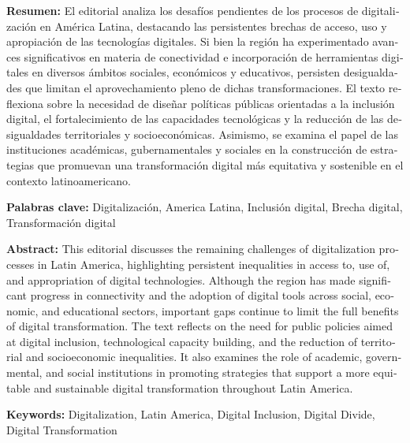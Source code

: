 \begin{tcolorbox}[colback=brown!8!white,colframe=brown!8!white,boxrule=0pt,arc=2pt,left=4pt,right=4pt,top=3pt,bottom=3pt,before skip=4pt,after skip=4pt]
\begin{otherlanguage}{spanish}
\sffamily\small \textbf{Resumen:} El editorial analiza los desafíos pendientes de los procesos de digitalización en América Latina, destacando las persistentes brechas de acceso, uso y apropiación de las tecnologías digitales. Si bien la región ha experimentado avances significativos en materia de conectividad e incorporación de herramientas digitales en diversos ámbitos sociales, económicos y educativos, persisten desigualdades que limitan el aprovechamiento pleno de dichas transformaciones. El texto reflexiona sobre la necesidad de diseñar políticas públicas orientadas a la inclusión digital, el fortalecimiento de las capacidades tecnológicas y la reducción de las desigualdades territoriales y socioeconómicas. Asimismo, se examina el papel de las instituciones académicas, gubernamentales y sociales en la construcción de estrategias que promuevan una transformación digital más equitativa y sostenible en el contexto latinoamericano.
\par\smallskip\noindent\textbf{Palabras clave:} Digitalización, America Latina, Inclusión digital, Brecha digital, Transformación digital
\end{otherlanguage}
\end{tcolorbox}

\begin{tcolorbox}[colback=brown!8!white,colframe=brown!8!white,boxrule=0pt,arc=2pt,left=4pt,right=4pt,top=3pt,bottom=3pt,before skip=4pt,after skip=4pt]
\begin{otherlanguage}{english}
\sffamily\small \textbf{Abstract:} This editorial discusses the remaining challenges of digitalization processes in Latin America, highlighting persistent inequalities in access to, use of, and appropriation of digital technologies. Although the region has made significant progress in connectivity and the adoption of digital tools across social, economic, and educational sectors, important gaps continue to limit the full benefits of digital transformation. The text reflects on the need for public policies aimed at digital inclusion, technological capacity building, and the reduction of territorial and socioeconomic inequalities. It also examines the role of academic, governmental, and social institutions in promoting strategies that support a more equitable and sustainable digital transformation throughout Latin America.
\par\smallskip\noindent\textbf{Keywords:} Digitalization, Latin America, Digital Inclusion, Digital Divide, Digital Transformation
\end{otherlanguage}
\end{tcolorbox}

